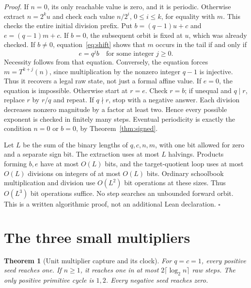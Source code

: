 \documentclass[11pt,letterpaper]{article}
\newtheorem{theorem}{Theorem}
\newenvironment{proof}{\noindent\textit{Proof.}}{\hfill\(\square\)}
\begin{document}
\begin{proof}
If \(n=0\), its only reachable value is zero, and it is periodic.
Otherwise extract \(n=2^k u\) and check each value \(n/2^i\),
\(0\le i\le k\), for equality with \(m\). This checks the entire
initial division prefix. Put \(b=(q-1)u+c\) and \(e=(q-1)m+c\).
If \(b=0\), the subsequent orbit is fixed at \(u\), which was
already checked. If \(b\ne0\), equation~\eqref{eq:shift} shows that
\(m\) occurs in the tail if and only if
\[
e=q^j b\quad\text{for some integer }j\ge0.
\]
Necessity follows from that equation. Conversely, the equation forces
\(m=T^{k+j}(n)\), since multiplication by the nonzero integer
\(q-1\) is injective. Thus it recovers a legal raw state, not just a
formal affine value.
If \(e=0\), the equation is impossible. Otherwise start at \(r=e\).
Check \(r=b\); if unequal and \(q\mid r\), replace \(r\) by
\(r/q\) and repeat. If \(q\nmid r\), stop with a negative answer.
Each division decreases nonzero magnitude by a factor at least two.
Hence every possible exponent is checked in finitely many steps.
Eventual periodicity is exactly the condition \(n=0\) or \(b=0\),
by Theorem~\ref{thm:signed}.

Let \(L\) be the sum of the binary lengths of \(q,c,n,m\), with
one bit allowed for zero and a separate sign bit. The extraction uses
at most \(L\) halvings. Products forming \(b,e\) have at most
\(O(L)\) bits, and the target-quotient loop uses at most \(O(L)\)
divisions on integers of at most \(O(L)\) bits. Ordinary schoolbook
multiplication and division use \(O(L^2)\) bit operations at these
sizes. Thus \(O(L^3)\) bit operations suffice. No step searches an
unbounded forward orbit. This is a written algorithmic proof, not an
additional Lean declaration.
\end{proof}

\section{The three small multipliers}

\begin{theorem}[Unit multiplier capture and its clock]
\label{thm:unit}
For \(q=c=1\), every positive seed reaches one. If \(n\ge1\), it
reaches one in at most \(2\lceil\log_2 n\rceil\) raw steps.
The only positive primitive cycle is \(1,2\).
Every negative seed reaches zero.
\end{theorem}
\end{document}
